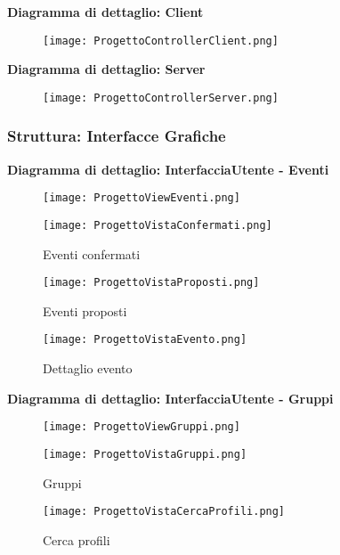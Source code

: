 \textbf{Diagramma di dettaglio: Client}
\begin{figure}[h!]
    \begin{center}
        \texttt{[image: ProgettoControllerClient.png]}
    \end{center}
\end{figure}

\textbf{Diagramma di dettaglio: Server}
\begin{figure}[h!]
    \begin{center}
        \texttt{[image: ProgettoControllerServer.png]}
    \end{center}
\end{figure}

\clearpage

\subsubsection{Struttura: Interfacce Grafiche}

\textbf{Diagramma di dettaglio: InterfacciaUtente - Eventi}
\begin{figure}[h!]
    \begin{center}
        \texttt{[image: ProgettoViewEventi.png]}
    \end{center}
\end{figure}
\begin{figure}[h!]
    \centering
    \texttt{[image: ProgettoVistaConfermati.png]}
    \caption{Eventi confermati}
\end{figure}
\begin{figure}[h!]
    \centering
    \texttt{[image: ProgettoVistaProposti.png]}
    \caption{Eventi proposti}
\end{figure}
\begin{figure}[h!]
    \centering
    \texttt{[image: ProgettoVistaEvento.png]}
    \caption{Dettaglio evento}
\end{figure}
\clearpage

\textbf{Diagramma di dettaglio: InterfacciaUtente - Gruppi}
\begin{figure}[h!]
    \begin{center}
        \texttt{[image: ProgettoViewGruppi.png]}
    \end{center}
\end{figure}
\begin{figure}[h!]
    \centering
    \texttt{[image: ProgettoVistaGruppi.png]}
    \caption{Gruppi}
\end{figure}
\begin{figure}[h!]
    \centering
    \texttt{[image: ProgettoVistaCercaProfili.png]}
    \caption{Cerca profili}
\end{figure}
\clearpage

